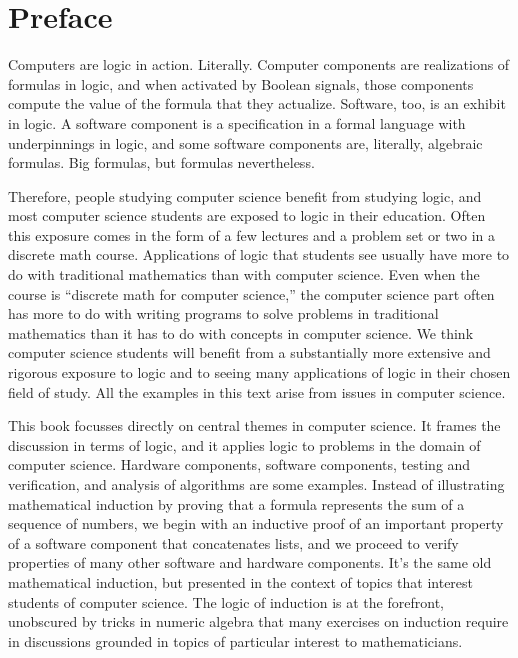 \chapter{Preface}
\label{ch:Preface}

Computers are logic in action. Literally.
Computer components are realizations of formulas in logic,
and when activated by Boolean signals, those components
compute the value of the formula that they actualize.
Software, too, is an exhibit in logic.
A software component is a specification in a formal language
with underpinnings in logic,
and some software components
are, literally, algebraic formulas.
Big formulas, but formulas nevertheless.

Therefore, people studying computer science
benefit from studying logic, and
most computer science students
are exposed to logic in their education.
Often this exposure comes
in the form of a few lectures and a problem set or two
in a discrete math course. Applications of logic that
students see usually have more to do with traditional mathematics
than with computer science. Even when the course
is ``discrete math for computer science,'' the computer science
part often has more to do with writing programs to solve problems
in traditional mathematics than it has to do with
concepts in computer science.
We think computer science students will
benefit from a substantially more extensive and rigorous
exposure to logic and to seeing many applications of
logic in their chosen field of study.
All the examples in this text arise from issues in computer science.

This book focusses directly on central themes
in computer science.
It frames the discussion in terms of logic,
and it applies logic to problems in the domain of computer science.
Hardware components, software components,
testing and verification, and analysis of algorithms
are some examples.
Instead of illustrating mathematical induction by proving
that a formula represents the sum of a sequence of numbers,
we begin with an inductive proof of an important property of
a software component that concatenates lists,
and we proceed to verify properties of
many other software and hardware components.
It's the same old mathematical induction, but presented
in the context of topics that interest
students of computer science.
The logic of induction is at the forefront,
unobscured by tricks in numeric algebra
that many exercises on induction require in
discussions grounded in topics
of particular interest to mathematicians.

